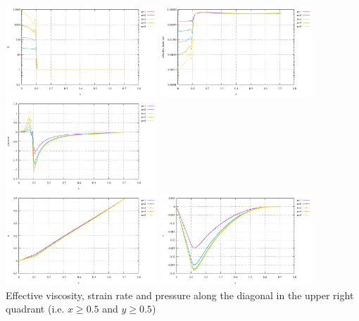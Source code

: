 \begin{center}
\includegraphics[width=5.7cm]{python_codes/fieldstone_87/results/experiment_05/diag_eta}
\includegraphics[width=5.7cm]{python_codes/fieldstone_87/results/experiment_05/diag_sr}
\includegraphics[width=5.7cm]{python_codes/fieldstone_87/results/experiment_05/diag_p}\\
\includegraphics[width=5.7cm]{python_codes/fieldstone_87/results/experiment_05/diag_u}
\includegraphics[width=5.7cm]{python_codes/fieldstone_87/results/experiment_05/diag_v}\\
{\captionfont Effective viscosity, strain rate and pressure along the diagonal in the 
upper right quadrant (i.e. $x\ge 0.5$ and $y\ge 0.5$)}
\end{center}

